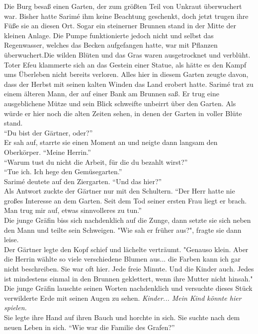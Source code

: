 Die Burg besaß einen Garten, der zum größten Teil von Unkraut überwuchert war. Bisher hatte Sarimé 
ihm keine Beachtung geschenkt, doch jetzt trugen ihre Füße sie an diesen Ort. Sogar ein steinerner 
Brunnen stand in der Mitte der kleinen Anlage. Die Pumpe funktionierte jedoch nicht und selbst das 
Regenwasser, welches das Becken aufgefangen hatte, war mit Pflanzen überwuchert.Die wilden Blüten 
und das Gras waren ausgetrocknet und verblüht. Toter Efeu klammerte sich an das Gestein einer 
Statue, als hätte es den Kampf ums Überleben nicht bereits verloren. Alles hier in diesem Garten 
zeugte davon, dass der Herbst mit seinen kalten Winden das Land erobert hatte. Sarimé trat zu 
einem älteren Mann, der auf einer Bank am Brunnen saß. Er trug eine ausgeblichene Mütze und sein 
Blick schweifte unbeirrt über den Garten. Als würde er hier noch die alten Zeiten sehen, in denen 
der Garten in voller Blüte stand.\\
``Du bist der Gärtner, oder?''\\
Er sah auf, starrte sie einen Moment an und neigte dann langsam den Oberkörper. ``Meine Herrin.''\\
``Warum tust du nicht die Arbeit, für die du bezahlt wirst?''\\
``Tue ich. Ich hege den Gemüsegarten.''\\
Sarimé deutete auf den Ziergarten. ``Und das hier?''\\
Als Antwort zuckte der Gärtner nur mit den Schultern. ``Der Herr hatte nie großes Interesse an dem 
Garten. Seit dem Tod seiner ersten Frau liegt er brach. Man trug mir auf, etwas sinnvolleres zu 
tun.''\\
Die junge Gräfin biss sich nachdenklich auf die Zunge, dann setzte sie sich neben den Mann und 
teilte sein Schweigen. 
"Wie sah er früher aus?", fragte sie dann leise.\\
Der Gärtner legte den Kopf schief und lächelte verträumt. "Genauso klein. Aber die Herrin wählte so 
viele verschiedene Blumen aus... die Farben kann ich gar nicht beschreiben. Sie war oft hier. Jede 
freie Minute. Und die Kinder auch. Jedes ist mindestens einmal in den Brunnen geklettert, wenn ihre 
Mutter nicht hinsah."\\
Die junge Gräfin lauschte seinen Worten nachdenklich und versuchte dieses Stück verwilderte Erde 
mit seinen Augen zu sehen. \textit{Kinder... Mein Kind könnte hier spielen.}\\
Sie legte ihre Hand auf ihren Bauch und horchte in sich. Sie suchte nach dem neuen Leben in 
sich. ``Wie war die Familie des Grafen?''\\
